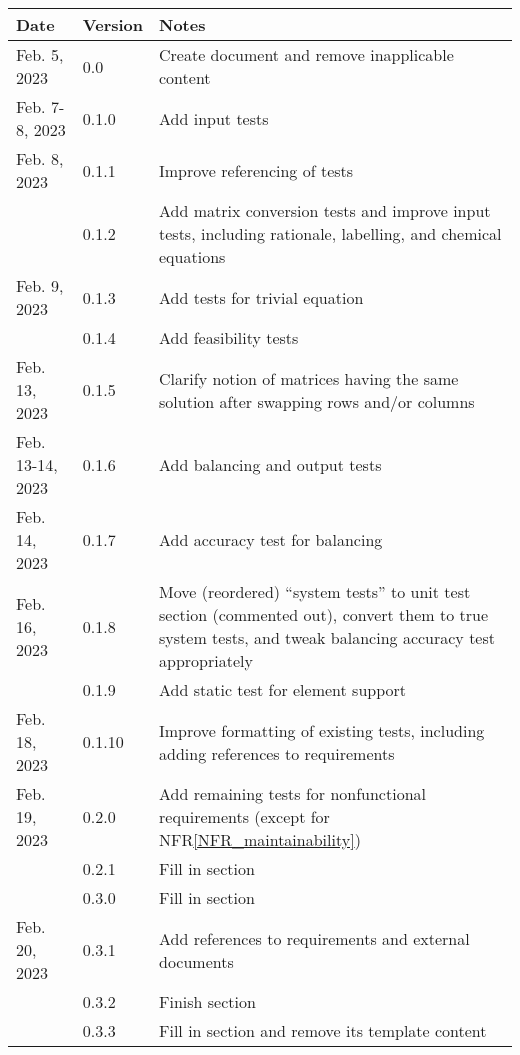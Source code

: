 \documentclass[12pt, titlepage]{article}
\newcommand{\nfrref}[1]{NFR\ref{#1}}
\begin{document}
\begin{tabularx}{\textwidth}{llX}
  \toprule {\bf Date} & {\bf Version} & {\bf Notes}                          \\
  \midrule
  Feb. 5, 2023        & 0.0           & Create document and remove
  inapplicable content                                                       \\
  Feb. 7-8, 2023      & 0.1.0         & Add input tests                      \\
  Feb. 8, 2023        & 0.1.1         & Improve referencing of tests         \\
                      & 0.1.2         & Add matrix conversion tests and
  improve input tests, including rationale, labelling, and chemical
  equations                                                                  \\
  Feb. 9, 2023        & 0.1.3         & Add tests for trivial equation       \\
                      & 0.1.4         & Add feasibility tests                \\
  Feb. 13, 2023       & 0.1.5         & Clarify notion of matrices having
  the same solution after swapping rows and/or columns                       \\
  Feb. 13-14, 2023    & 0.1.6         & Add balancing and output tests       \\
  Feb. 14, 2023       & 0.1.7         & Add accuracy test for balancing      \\
  Feb. 16, 2023       & 0.1.8         & Move (reordered) ``system tests'' to
  unit test section (commented out), convert them to true system tests, and
  tweak balancing accuracy test appropriately                                \\
                      & 0.1.9         & Add static test for element support  \\
  Feb. 18, 2023       & 0.1.10        & Improve formatting of existing
  tests, including adding references to requirements                         \\
  Feb. 19, 2023       & 0.2.0         & Add remaining tests for
  nonfunctional requirements (except for \nfrref{NFR_maintainability})       \\
                      & 0.2.1         & Fill in \nameref{sec_plan} section   \\
                      & 0.3.0         & Fill in \nameref{sec_gen_info}
  section                                                                    \\
  Feb. 20, 2023       & 0.3.1         & Add references to requirements and
  external documents                                                         \\
                      & 0.3.2         & Finish \nameref{sec_abbrsAcros}
  section                                                                    \\
                      & 0.3.3         & Fill in \nameref{sec_unit_tests}
  section and remove its template content                                    \\
  \bottomrule
\end{tabularx}
\end{document}
